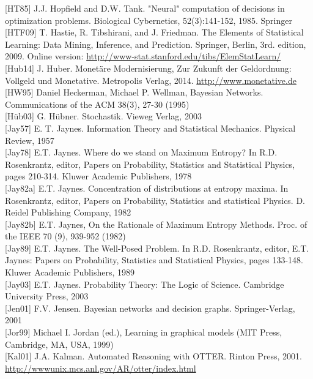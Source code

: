 \documentclass[10pt]{article}
\begin{document}
[HT85] J.J. Hopfield and D.W. Tank. "Neural" computation of decisions in optimization problems. Biological Cybernetics, 52(3):141-152, 1985. Springer\\[0pt]
[HTF09] T. Hastie, R. Tibshirani, and J. Friedman. The Elements of Statistical Learning: Data Mining, Inference, and Prediction. Springer, Berlin, 3rd. edition, 2009. Online version: \href{http://www-stat.stanford.edu/tibs/ElemStatLearn/}{http://www-stat.stanford.edu/tibs/ElemStatLearn/}\\[0pt]
[Hub14] J. Huber. Monetäre Modernisierung, Zur Zukunft der Geldordnung: Vollgeld und Monetative. Metropolis Verlag, 2014. \href{http://www.monetative.de}{http://www.monetative.de}\\[0pt]
[HW95] Daniel Heckerman, Michael P. Wellman, Bayesian Networks. Communications of the ACM 38(3), 27-30 (1995)\\[0pt]
[Hüb03] G. Hübner. Stochastik. Vieweg Verlag, 2003\\[0pt]
[Jay57] E. T. Jaynes. Information Theory and Statistical Mechanics. Physical Review, 1957\\[0pt]
[Jay78] E.T. Jaynes. Where do we stand on Maximum Entropy? In R.D. Rosenkrantz, editor, Papers on Probability, Statistics and Statistical Physics, pages 210-314. Kluwer Academic Publishers, 1978\\[0pt]
[Jay82a] E.T. Jaynes. Concentration of distributions at entropy maxima. In Rosenkrantz, editor, Papers on Probability, Statistics and statistical Physics. D. Reidel Publishing Company, 1982\\[0pt]
[Jay82b] E.T. Jaynes, On the Rationale of Maximum Entropy Methods. Proc. of the IEEE 70 (9), 939-952 (1982)\\[0pt]
[Jay89] E.T. Jaynes. The Well-Posed Problem. In R.D. Rosenkrantz, editor, E.T. Jaynes: Papers on Probability, Statistics and Statistical Physics, pages 133-148. Kluwer Academic Publishers, 1989\\[0pt]
[Jay03] E.T. Jaynes. Probability Theory: The Logic of Science. Cambridge University Press, 2003\\[0pt]
[Jen01] F.V. Jensen. Bayesian networks and decision graphs. Springer-Verlag, 2001\\[0pt]
[Jor99] Michael I. Jordan (ed.), Learning in graphical models (MIT Press, Cambridge, MA, USA, 1999)\\[0pt]
[Kal01] J.A. Kalman. Automated Reasoning with OTTER. Rinton Press, 2001. \href{http://wwwunix.mcs.anl.gov/AR/otter/index.html}{http://wwwunix.mcs.anl.gov/AR/otter/index.html}\\[0pt]
\end{document}
